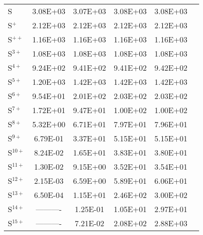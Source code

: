 \begin{table}[ht]
\begin{tabular}{l|c|c|c|c|c}
    \hline
    S         & 3.08E+03 & 3.07E+03 & 3.08E+03 & 3.08E+03 & \\
    S$^+$     & 2.12E+03 & 2.12E+03 & 2.12E+03 & 2.12E+03 & \\
    S$^{ ++}$ & 1.16E+03 & 1.16E+03 & 1.16E+03 & 1.16E+03 & \\
    S$^{ 3+}$ & 1.08E+03 & 1.08E+03 & 1.08E+03 & 1.08E+03 & \\
    S$^{ 4+}$ & 9.24E+02 & 9.41E+02 & 9.41E+02 & 9.42E+02 & \\
    S$^{ 5+}$ & 1.20E+03 & 1.42E+03 & 1.42E+03 & 1.42E+03 & \\
    S$^{ 6+}$ & 9.54E+01 & 2.01E+02 & 2.03E+02 & 2.03E+02 & \\
    S$^{ 7+}$ & 1.72E+01 & 9.47E+01 & 1.00E+02 & 1.00E+02 & \\
    S$^{ 8+}$ & 5.32E+00 & 6.71E+01 & 7.97E+01 & 7.96E+01 & \\
    S$^{ 9+}$ & 6.79E-01 & 3.37E+01 & 5.15E+01 & 5.15E+01 & \\
    S$^{10+}$ & 8.24E-02 & 1.65E+01 & 3.83E+01 & 3.80E+01 & \\
    S$^{11+}$ & 1.30E-02 & 9.15E+00 & 3.52E+01 & 3.54E+01 & \\
    S$^{12+}$ & 2.15E-03 & 6.59E+00 & 5.89E+01 & 6.06E+01 & \\
    S$^{13+}$ & 6.50E-04 & 1.15E+01 & 2.46E+02 & 3.00E+02 & \\
    S$^{14+}$ & ---------- & 1.25E-01 & 1.05E+01 & 2.97E+01 & \\
    S$^{15+}$ & ---------- & 7.21E-02 & 2.08E+02 & 2.88E+03 & \\
    \hline
    \end{tabular}
    \label{tab:SulDEProd}
\end{table}

